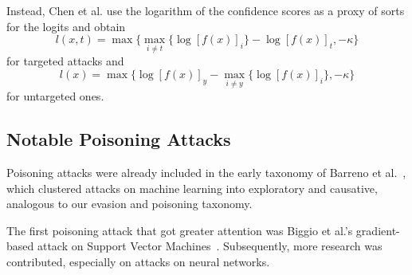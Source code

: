 \documentclass[review]{AIM_report}
\begin{document}
Instead, Chen et al. use the logarithm of the confidence scores as a proxy of sorts for the logits %
and obtain
\[
l(x,t) = \max\{ \max_{i\neq t} \{\log[f(x)]_i\} - \log[f(x)]_t,-\kappa \}
\]
for targeted attacks and
\[
l(x) = \max\{ \log[f(x)]_{y} - \max_{i\neq y} \{\log[f(x)]_i\} ,-\kappa \}
\]
for untargeted ones.









\subsection{Notable Poisoning Attacks}

Poisoning attacks were already included in the early taxonomy of Barreno et al.~\cite{barreno2010security}, which clustered attacks on machine learning into exploratory and causative, analogous to our evasion and poisoning taxonomy.

The first poisoning attack that got greater attention was Biggio et al.'s gradient-based attack on Support Vector Machines~\cite{biggio2012poisoning}. Subsequently, more research was contributed, especially on attacks on neural networks.

\end{document}
